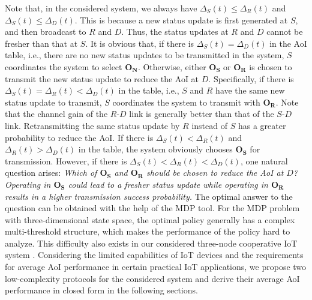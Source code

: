 \documentclass{IEEEtran}
\begin{document}
Note that, in the considered system, we always have  $\Delta_{S}(t)\leq\Delta_{R}(t)$ and $\Delta_{S}(t)\leq \Delta_{D}(t)$. This is because a new status update is first generated at $S$, and then broadcast to $R$ and $D$. Thus, the status updates at $R$ and $D$ cannot be fresher than that at $S$. It is obvious that, if there is $\Delta_{S}(t)=\Delta_{D}(t)$ in the AoI table, i.e., there are no new status updates to be transmitted in the system, $S$ coordinates the system to select $\mathbf{O}_{\mathbf{N}}$. Otherwise, either $\mathbf{O}_{\mathbf{S}}$ or $\mathbf{O}_{\mathbf{R}}$ is chosen to transmit the new status update to reduce the AoI at $D$. Specifically, if there is $\Delta_{S}(t)=\Delta_{R}(t)<\Delta_{D}(t)$ in the table, i.e., $S$ and $R$ have the same new status update to transmit, $S$ coordinates the system to transmit with $\mathbf{O}_{\mathbf{R}}$. Note that the channel gain of the $R$-$D$ link is generally better than that of the $S$-$D$ link. Retransmitting the same status update by $R$ instead of $S$ has a greater probability to reduce the AoI. If there is $\Delta_{S}(t)<\Delta_{R}(t)$ and $\Delta_{R}(t)>\Delta_{D}(t)$ in the table, the system obviously chooses $\mathbf{O}_{\mathbf{S}}$ for transmission. However, if there is $\Delta_{S}(t)<\Delta_{R}(t)<\Delta_{D}(t)$, one natural question arises: \textit{Which of $\mathbf{O}_{\mathbf{S}}$ and $\mathbf{O}_{\mathbf{R}}$ should be chosen to reduce the AoI at $D$? Operating in  $\mathbf{O}_{\mathbf{S}}$ could lead to a fresher status update while operating in  $\mathbf{O}_{\mathbf{R}}$ results in a higher transmission success probability.} The optimal answer to the question can be obtained with the help of the MDP tool. For the MDP problem with three-dimensional state space, the optimal policy generally has a complex multi-threshold structure, which makes the performance of the policy hard to analyze. This difficulty also exists in our considered three-node cooperative IoT system \cite{b42}. Considering the limited capabilities of IoT devices and the requirements for average AoI performance in certain practical IoT applications, we propose two low-complexity protocols for  the considered system and derive their average AoI performance in closed form in the following sections.

\end{document}
